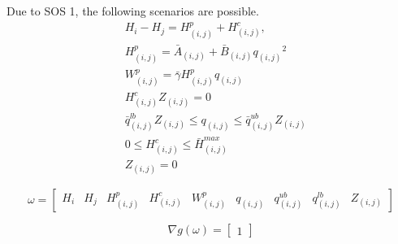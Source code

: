 Due to SOS 1, the following scenarios are possible.
\begin{subequations}
    \begin{alignat}{2}
    & H_i - H_j = H^p_{(i,j)} + H^c_{(i,j)},  
    \\
    & H^p_{(i,j)} = \bar{A}_{(i,j)} + \bar{B}_{(i,j)}{q_{(i,j)}}^2
    \\
    & W^p_{(i,j)} = \bar{\gamma} H^p_{(i,j)} q_{(i,j)} 
    \\
    & H^c_{(i,j)}Z_{(i,j)} = 0
    \\
    & \bar {q}^{lb}_{(i,j)} Z_{(i,j)}  \leq  q_{(i,j)} \leq \bar{q}^{ub}_{(i,j)}Z_{(i,j)} 
    \\
    & 0 \leq H^c_{(i,j)} \leq \bar H^{max}_{(i,j)} 
    \\
    & Z_{(i,j)} = 0
    \end{alignat}
\end{subequations}

\begin{equation}
    \omega = \left[\begin{array}{ccccccccccc}
        H_i & H_j & H^p_{(i,j)} & H^c_{(i,j)} &W^p_{(i,j)} & q_{(i,j)} & q^{ub}_{(i,j)} & q^{lb}_ {(i,j)} & Z_{(i,j)}
    \end{array}\right]
\end{equation}

\begin{equation}
    \nabla g(\omega) = \begin{bmatrix}
        1
    \end{bmatrix}
\end{equation}